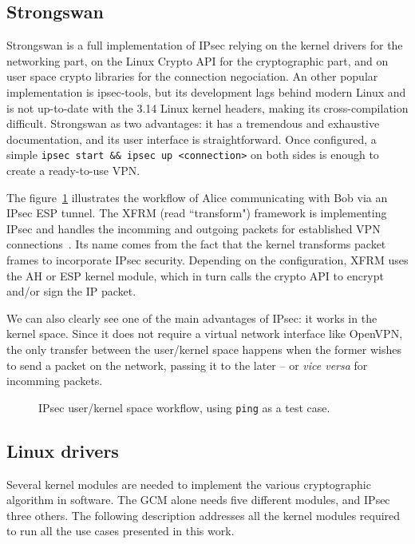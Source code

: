 

\subsection{Strongswan}
Strongswan is a full implementation of IPsec relying on the kernel drivers for the networking part, on the Linux Crypto API for the cryptographic part, and on user space crypto libraries for the connection negociation.
An other popular implementation is ipsec-tools, but its development lags behind modern Linux and is not up-to-date with the 3.14 Linux kernel headers, making its cross-compilation difficult.
Strongswan as two advantages: it has a tremendous and exhaustive documentation, and its user interface is straightforward.
Once configured, a simple \texttt{ipsec start \&\& ipsec up <connection>} on both sides is enough to create a ready-to-use VPN.

The figure~\ref{fig:ipsec-workflow} illustrates the workflow of Alice communicating with Bob via an IPsec ESP tunnel.
The XFRM (read ``transform") framework is implementing IPsec and handles the incomming and outgoing packets for established VPN connections~\cite{rosen2014}.
Its name comes from the fact that the kernel transforms packet frames to incorporate IPsec security.
Depending on the configuration, XFRM uses the AH or ESP kernel module, which in turn calls the crypto API to encrypt and/or sign the IP packet.

We can also clearly see one of the main advantages of IPsec: it works in the kernel space.
Since it does not require a virtual network interface like OpenVPN, the only transfer between the user/kernel space happens when the former wishes to send a packet on the network, passing it to the later -- or \textit{vice versa} for incomming packets.

\begin{figure}[ht]
\Large
\resizebox{\linewidth}{!}{%

}
\caption{IPsec user/kernel space workflow, using \texttt{ping} as a test case.}{}
\label{fig:ipsec-workflow}
\end{figure}


\subsection{Linux drivers}
Several kernel modules are needed to implement the various cryptographic algorithm in software.
The GCM alone needs five different modules, and IPsec three others.
The following description addresses all the kernel modules required to run all the use cases presented in this work.


